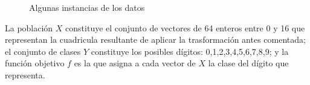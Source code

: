 \documentclass[a4]{article}
\begin{document}
\vspace{-5mm}
\begin{figure}[H]
  \centering
  \caption{Algunas instancias de los datos}
  \label{fig:samples}
\end{figure}

La población $X$ constituye el conjunto de vectores de 64 enteros
entre 0 y 16 que representan la cuadricula resultante de aplicar la
trasformación antes comentada; el conjunto de clases $Y$ constituye
los posibles dígitos: 0,1,2,3,4,5,6,7,8,9; y la función objetivo $f$
es la que asigna a cada vector de $X$ la clase del dígito que
representa.
\end{document}
